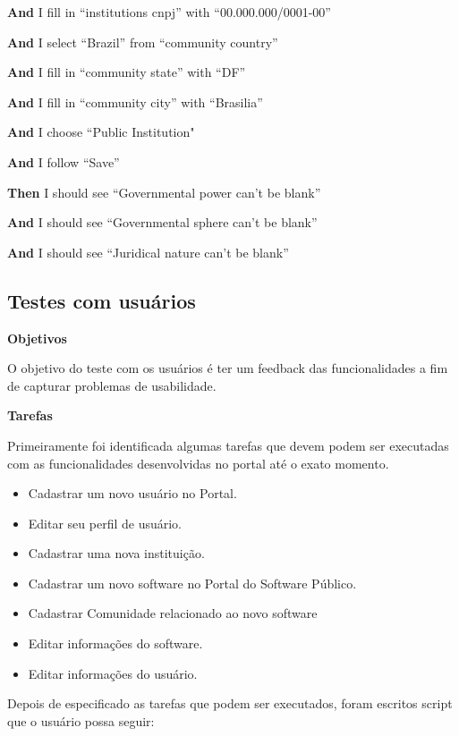     \textbf{And }I fill in ``institutions cnpj'' with ``00.000.000/0001-00''

    \textbf{And }I select ``Brazil'' from ``community country''

    \textbf{And }I fill in ``community state'' with ``DF''

    \textbf{And }I fill in ``community city'' with ``Brasilia''

    \textbf{And }I choose ``Public Institution"

    \textbf{And }I follow ``Save''

    \textbf{Then} I should see ``Governmental power can't be blank''

    \textbf{And }I should see ``Governmental sphere can't be blank''

    \textbf{And }I should see ``Juridical nature can't be blank''


\subsection{Testes com usuários}
	
	\textbf{Objetivos}
	
		O objetivo do teste com os usuários é ter um feedback das funcionalidades a fim de capturar problemas de usabilidade. 
	
	\textbf{Tarefas}

	Primeiramente foi identificada algumas tarefas que devem podem ser executadas com as funcionalidades desenvolvidas no portal até o exato momento.
	
	\begin{itemize}
	
		\item Cadastrar um novo usuário no Portal.
		\item Editar seu perfil de usuário.
		\item Cadastrar uma nova instituição.
		\item Cadastrar um novo software no Portal do Software Público.
		\item Cadastrar Comunidade relacionado ao novo software
		\item Editar informações do software.
		\item Editar informações do usuário.
		
	\end{itemize}
	
	Depois de especificado as tarefas que podem ser executados, foram escritos script que o usuário possa seguir:
	
